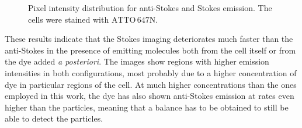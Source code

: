 \documentclass[journal=nalefd,manuscript=letter]{achemso}
\newcommand{\atto}{\ensuremath{\textrm{ATTO}\,647\textrm{N}}}
\begin{document}
\begin{figure}[htp]
\centering
	\caption{Pixel intensity distribution for anti-Stokes and Stokes emission.
	The cells were stained with \atto.}
	\label{fig:distribution_pixels}
\end{figure}

These results indicate that the Stokes imaging deteriorates much faster than the
anti-Stokes in the presence of emitting molecules both from the cell itself or
from the dye added \textit{a posteriori}. The images show regions with higher
emission intensities in both configurations, most probably due to a higher concentration
of dye in particular regions of the cell. At much higher concentrations than
the ones employed in this work, the dye has also shown anti-Stokes emission at
rates even higher than the particles, meaning that a balance has to be obtained
to still be able to detect the particles.
\end{document}
